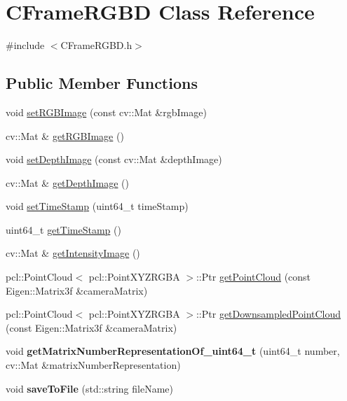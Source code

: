 \hypertarget{class_c_frame_r_g_b_d}{
\section{CFrameRGBD Class Reference}
\label{class_c_frame_r_g_b_d}
}


{\ttfamily \#include $<$CFrameRGBD.h$>$}

\subsection*{Public Member Functions}
\begin{DoxyCompactItemize}
\item 
void \hyperlink{class_c_frame_r_g_b_d_a1babff86224475dd7b7e6960fbb71663}{setRGBImage} (const cv::Mat \&rgbImage)
\item 
cv::Mat \& \hyperlink{class_c_frame_r_g_b_d_a6775deb1a76779b2f8de4cdc9dd6c548}{getRGBImage} ()
\item 
void \hyperlink{class_c_frame_r_g_b_d_a04b2bf58c8c5027148219675f626eeb7}{setDepthImage} (const cv::Mat \&depthImage)
\item 
cv::Mat \& \hyperlink{class_c_frame_r_g_b_d_a21d4754f8db3a0a93dbe1d67a00f4ce5}{getDepthImage} ()
\item 
void \hyperlink{class_c_frame_r_g_b_d_ab778d5eb102f577cc338ee1812846ac9}{setTimeStamp} (uint64\_\-t timeStamp)
\item 
uint64\_\-t \hyperlink{class_c_frame_r_g_b_d_a9c441cdc349038fae31bffc4d0202b2c}{getTimeStamp} ()
\item 
cv::Mat \& \hyperlink{class_c_frame_r_g_b_d_a7fd118a6a456ee314009f1fd260e70e0}{getIntensityImage} ()
\item 
pcl::PointCloud$<$ pcl::PointXYZRGBA $>$::Ptr \hyperlink{class_c_frame_r_g_b_d_aae45ce5efb781c914ec8b420970ce492}{getPointCloud} (const Eigen::Matrix3f \&cameraMatrix)
\item 
pcl::PointCloud$<$ pcl::PointXYZRGBA $>$::Ptr \hyperlink{class_c_frame_r_g_b_d_af2d7e89a8f680b567f4b798beb075f8e}{getDownsampledPointCloud} (const Eigen::Matrix3f \&cameraMatrix)
\item 
\hypertarget{class_c_frame_r_g_b_d_a976a8d17209c3b3190ea7404a4d2464e}{
void {\bfseries getMatrixNumberRepresentationOf\_\-uint64\_\-t} (uint64\_\-t number, cv::Mat \&matrixNumberRepresentation)}
\label{class_c_frame_r_g_b_d_a976a8d17209c3b3190ea7404a4d2464e}

\item 
\hypertarget{class_c_frame_r_g_b_d_aa06519642bbec944c008786c6d5a21aa}{
void {\bfseries saveToFile} (std::string fileName)}
\label{class_c_frame_r_g_b_d_aa06519642bbec944c008786c6d5a21aa}


\end{DoxyCompactItemize}
